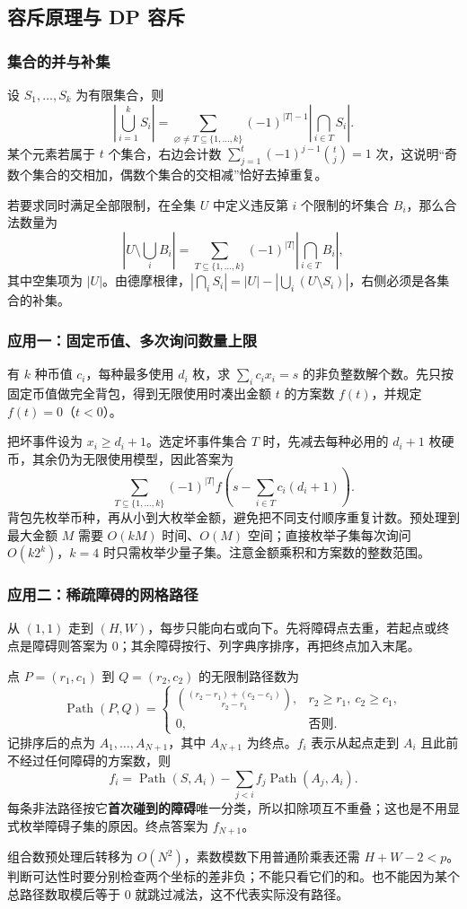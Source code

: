 \subsection{容斥原理与 DP 容斥}
\label{math:inclusion}
\subsubsection*{集合的并与补集}
设 $S_1,\ldots,S_k$ 为有限集合，则
\[
    \left|\bigcup_{i=1}^kS_i\right|
    =\sum_{\varnothing\ne T\subseteq\{1,\ldots,k\}}
    (-1)^{|T|-1}\left|\bigcap_{i\in T}S_i\right|.
\]
某个元素若属于 $t$ 个集合，右边会计数 $\sum_{j=1}^t(-1)^{j-1}\binom tj=1$ 次，这说明“奇数个集合的交相加，偶数个集合的交相减”恰好去掉重复。

若要求同时满足全部限制，在全集 $U$ 中定义违反第 $i$ 个限制的坏集合 $B_i$，那么合法数量为
\[
    |U\setminus\textstyle\bigcup_iB_i|
    =\sum_{T\subseteq\{1,\ldots,k\}}
    (-1)^{|T|}\left|\bigcap_{i\in T}B_i\right|,
\]
其中空集项为 $|U|$。由德摩根律，$|\bigcap_i S_i|=|U|-|\bigcup_i(U\setminus S_i)|$，右侧必须是各集合的补集。

\subsubsection*{应用一：固定币值、多次询问数量上限}
有 $k$ 种币值 $c_i$，每种最多使用 $d_i$ 枚，求 $\sum_i c_ix_i=s$ 的非负整数解个数。先只按固定币值做完全背包，得到无限使用时凑出金额 $t$ 的方案数 $f(t)$，并规定 $f(t)=0$（$t<0$）。

把坏事件设为 $x_i\geq d_i+1$。选定坏事件集合 $T$ 时，先减去每种必用的 $d_i+1$ 枚硬币，其余仍为无限使用模型，因此答案为
\[
    \sum_{T\subseteq\{1,\ldots,k\}}(-1)^{|T|}
    f\!\left(s-\sum_{i\in T}c_i(d_i+1)\right).
\]
背包先枚举币种，再从小到大枚举金额，避免把不同支付顺序重复计数。预处理到最大金额 $M$ 需要 $O(kM)$ 时间、$O(M)$ 空间；直接枚举子集每次询问 $O(k2^k)$，$k=4$ 时只需枚举少量子集。注意金额乘积和方案数的整数范围。

\subsubsection*{应用二：稀疏障碍的网格路径}
从 $(1,1)$ 走到 $(H,W)$，每步只能向右或向下。先将障碍点去重，若起点或终点是障碍则答案为 $0$；其余障碍按行、列字典序排序，再把终点加入末尾。

点 $P=(r_1,c_1)$ 到 $Q=(r_2,c_2)$ 的无限制路径数为
\[
    \operatorname{Path}(P,Q)=
    \begin{cases}
        \displaystyle\binom{(r_2-r_1)+(c_2-c_1)}{r_2-r_1},
        &r_2\geq r_1,\ c_2\geq c_1,\\
        0,&\text{否则}.
    \end{cases}
\]
记排序后的点为 $A_1,\ldots,A_{N+1}$，其中 $A_{N+1}$ 为终点。$f_i$ 表示从起点走到 $A_i$ 且此前不经过任何障碍的方案数，则
\[
    f_i=\operatorname{Path}(S,A_i)-
    \sum_{j<i}f_j\operatorname{Path}(A_j,A_i).
\]
每条非法路径按它\textbf{首次碰到的障碍}唯一分类，所以扣除项互不重叠；这也是不用显式枚举障碍子集的原因。终点答案为 $f_{N+1}$。

组合数预处理后转移为 $O(N^2)$，素数模数下用普通阶乘表还需 $H+W-2<p$。判断可达性时要分别检查两个坐标的差非负；不能只看它们的和。也不能因为某个总路径数取模后等于 $0$ 就跳过减法，这不代表实际没有路径。
